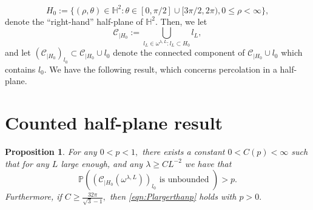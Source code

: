 \documentclass[10pt,a4paper]{amsart}
\newcommand{\BH}{{\mathbb{H}}}
\newcommand{\BP}{{\mathbb{P}}}
\newcommand{\CC}{{\mathcal{C}}}
\newtheorem{proposition}[theorem]{Proposition}
\begin{document}
\[
H_0:=\{(\rho,\theta)\in \BH^2: \theta \in[0,\pi/2]\cup [3\pi/2,2\pi), 0\leq \rho<\infty\},
\]
denote the ``right-hand'' half-plane of $\BH^2.$ Then, we let
\begin{equation} \label{eqn:defCH0}
\CC_{|H_0}:= \bigcup_{l_L\in \omega^{\lambda,L}: l_L\subset H_0} l_L,   
\end{equation}
and let $\left(\CC_{|H_0}\right)_{l_0}\subset \CC_{|H_0}\cup l_0$ denote the connected component of 
$\CC_{|H_0} \cup l_0$ which contains $l_0.$ We have the following result, which 
concerns
percolation in a half-plane. 

\section{Counted half-plane result}
\begin{proposition} \label{prop:half-plane}
For any $0<p<1,$ there exists a constant $0<C(p)<\infty$ such that for any $L$ large enough, 
and any $\lambda \geq CL^{-2}$ we have that 
\begin{equation}\label{eqn:Plargerthanp}
 \BP\left(\left(\CC_{|H_0}(\omega^{\lambda,L})\right)_{l_0} \textrm{ is unbounded }\right)>p.   
\end{equation}
Furthermore, if $C\geq \frac{32 \pi}{\sqrt{3}-1},$ then 
\eqref{eqn:Plargerthanp} holds with $p>0.$
\end{proposition}
\end{document}
